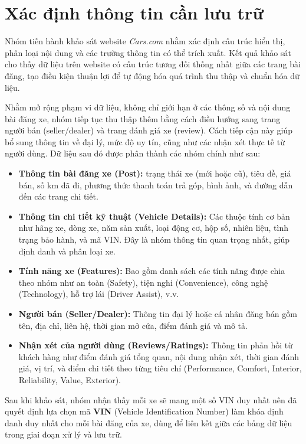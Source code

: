 \section{Xác định thông tin cần lưu trữ}
Nhóm tiến hành khảo sát website \textit{Cars.com} nhằm xác định cấu trúc hiển thị, phân loại nội dung và các trường thông tin có thể trích xuất. Kết quả khảo sát cho thấy dữ liệu trên website có cấu trúc tương đối thống nhất giữa các trang bài đăng, tạo điều kiện thuận lợi để tự động hóa quá trình thu thập và chuẩn hóa dữ liệu.

Nhằm mở rộng phạm vi dữ liệu, không chỉ giới hạn ở các thông số và nội dung bài đăng xe, nhóm tiếp tục thu thập thêm bằng cách điều hướng sang trang người bán (seller/dealer) và trang đánh giá xe (review). Cách tiếp cận này giúp bổ sung thông tin về đại lý, mức độ uy tín, cũng như các nhận xét thực tế từ người dùng. Dữ liệu sau đó được phân thành các nhóm chính như sau:

\begin{itemize}
    \item \textbf{Thông tin bài đăng xe (Post):} trạng thái xe (mới hoặc cũ), tiêu đề, giá bán, số km đã đi, phương thức thanh toán trả góp, hình ảnh, và đường dẫn đến các trang chi tiết.
    \item \textbf{Thông tin chi tiết kỹ thuật (Vehicle Details):} Các thuộc tính cơ bản như hãng xe, dòng xe, năm sản xuất, loại động cơ, hộp số, nhiên liệu, tình trạng bảo hành, và mã VIN. Đây là nhóm thông tin quan trọng nhất, giúp định danh và phân loại xe.
    \item \textbf{Tính năng xe (Features):} Bao gồm danh sách các tính năng được chia theo nhóm như an toàn (Safety), tiện nghi (Convenience), công nghệ (Technology), hỗ trợ lái (Driver Assist), v.v.
    \item \textbf{Người bán (Seller/Dealer):} Thông tin đại lý hoặc cá nhân đăng bán gồm tên, địa chỉ, liên hệ, thời gian mở cửa, điểm đánh giá và mô tả.
    \item \textbf{Nhận xét của người dùng (Reviews/Ratings):} Thông tin phản hồi từ khách hàng như điểm đánh giá tổng quan, nội dung nhận xét, thời gian đánh giá, vị trí, và điểm chi tiết theo từng tiêu chí (Performance, Comfort, Interior, Reliability, Value, Exterior).
\end{itemize}

Sau khi khảo sát, nhóm nhận thấy mỗi xe sẽ mang một số VIN duy nhất nên đã quyết định lựa chọn mã \textbf{VIN} (Vehicle Identification Number) làm khóa định danh duy nhất cho mỗi bài đăng của xe, dùng để liên kết giữa các bảng dữ liệu trong giai đoạn xử lý và lưu trữ.

